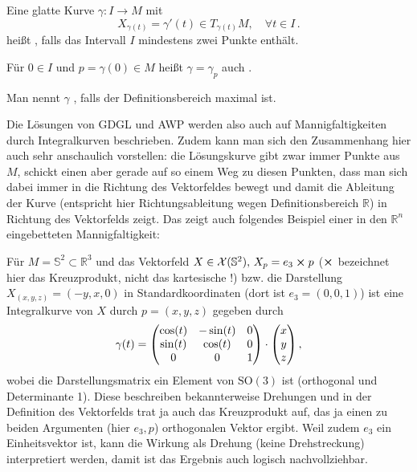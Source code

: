 \documentclass[../H_Analysis_main.tex]{subfiles}
\begin{document}
\begin{defi}[Integralkurve]
Eine glatte Kurve $\gamma: I \rightarrow M$ mit
\begin{equation}
X_{\gamma(t)} = \gamma'(t) \in T_{\gamma(t)} M, \quad \forall t \in I \, .
\end{equation}
heißt , falls das Intervall $I$ mindestens zwei Punkte enthält.

Für $0 \in I$ und $p = \gamma(0) \in M$ heißt $\gamma = \gamma_p$ auch .

Man nennt $\gamma$ , falls der Definitionsbereich maximal ist.
\end{defi}

Die Lösungen von GDGL und AWP werden also auch auf Mannigfaltigkeiten durch Integralkurven beschrieben. Zudem kann man sich den Zusammenhang hier auch sehr anschaulich vorstellen: die Lösungskurve gibt zwar immer Punkte aus $M$, schickt einen aber gerade auf so einem Weg zu diesen Punkten, dass man sich dabei immer in die Richtung des Vektorfeldes bewegt und damit die Ableitung der Kurve (entspricht hier Richtungsableitung wegen Definitionsbereich $\mathbb{R}$) in Richtung des Vektorfelds zeigt. Das zeigt auch folgendes Beispiel einer in den $\mathbb{R}^n$ eingebetteten Mannigfaltigkeit:
\begin{bsp}\label{bsp:awpsphere}
Für $M = \mathbb{S}^2 \subset \mathbb{R}^3$ und das Vektorfeld $X \in \mathcal{X}(\mathbb{S}^2), \, X_p = e_3 \cross p$ ($\cross$ bezeichnet hier das Kreuzprodukt, nicht das kartesische !) bzw. die Darstellung $X_{(x, y, z)} = (-y, x, 0)$ in Standardkoordinaten (dort ist $e_3 = (0, 0, 1)$) ist eine Integralkurve von $X$ durch $p = (x, y, z)$ gegeben durch
\begin{equation}\label{eq:sphvektfeld}
\gamma(t) = \mqty(\cos(t) & - \sin(t) & 0 \\ \sin(t) & \cos(t) & 0 \\ 0 & 0 & 1) \cdot \mqty(x \\ y \\ z) \, ,
\end{equation}
wobei die Darstellungsmatrix ein Element von $\text{SO}(3)$ ist (orthogonal und Determinante 1). Diese beschreiben bekannterweise Drehungen und in der Definition des Vektorfelds trat ja auch das Kreuzprodukt auf, das ja einen zu beiden Argumenten (hier $e_3, p$) orthogonalen Vektor ergibt. Weil zudem $e_3$ ein Einheitsvektor ist, kann die Wirkung als Drehung (keine Drehstreckung) interpretiert werden, damit ist das Ergebnis auch logisch nachvollziehbar.
\end{bsp}
\end{document}

